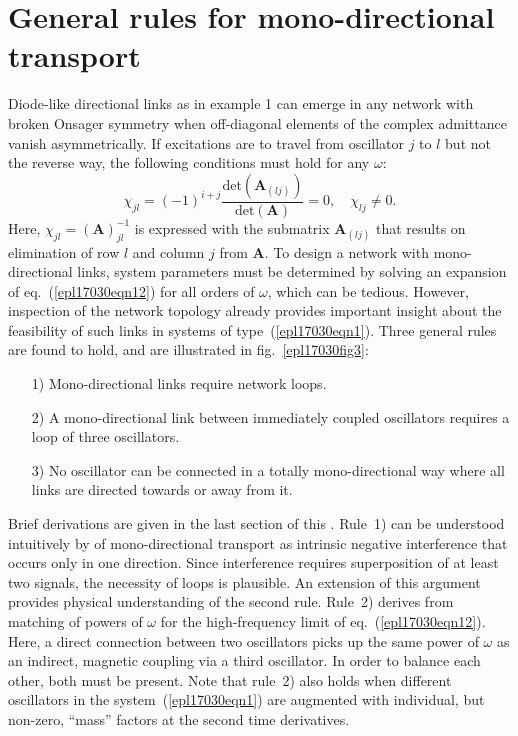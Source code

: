 \documentclass[doublecol,final,edchoice]{epl2}
\begin{document}
\section{General rules for mono-directional transport}

Diode-like directional links as in example 1 can emerge in any network with broken Onsager symmetry when off-diagonal elements of the complex admittance vanish asymmetrically. If excitations are to travel from oscillator $j$ to $l$ but not the reverse way, the following conditions must hold for any $\omega$:
\begin{equation}%
\chi_{jl} = (-1)^{i+j}\frac{\mathrm{det}\left(\mathbf{A}_{(lj)}\right)}{\mathrm{det}\left(\mathbf{A}\right)} = 0, \quad \chi_{lj} \neq 0.
\label{epl17030eqn12}
\end{equation}
Here, $\chi_{jl}=(\mathbf{A})^{-1}_{jl}$ is expressed with the submatrix $\mathbf{A}_{(lj)}$ that results on elimination of row $l$ and column $j$ from $\mathbf{A}$. To design a network with mono-directional links, system parameters must be determined by solving an expansion of eq.~(\ref{epl17030eqn12}) for all orders of $\omega$, which can be tedious. However, inspection of the network topology already provides important insight about the feasibility of such links in systems of type~(\ref{epl17030eqn1}). Three general rules are found to hold, and are illustrated in fig.~\ref{epl17030fig3}:

\begin{enumerate}

\item[1)] Mono-directional links require network loops.
\item[2)] A mono-directional link between immediately coupled oscillators requires a loop of three oscillators.
\item[3)] No oscillator can be connected in a totally mono-directional way where all links are directed towards or away from it.
\end{enumerate}
Brief derivations are given in the last section of this . Rule~1) can be understood intuitively by  of mono-directional transport as intrinsic negative interference that occurs only in one direction. Since interference requires superposition of at least two signals, the necessity of loops is plausible. An extension of this argument provides physical understanding of the second rule. Rule~2) derives from matching of powers of $\omega$ for the high-frequency limit of eq.~(\ref{epl17030eqn12}). Here, a direct connection between two oscillators picks up the same power of $\omega$ as an indirect, magnetic coupling via a third oscillator. In order to balance each other, both must be present. Note that rule~2) also holds when different oscillators in the system~(\ref{epl17030eqn1}) are augmented with individual, but non-zero, ``mass'' factors at the second time derivatives.
\end{document}
